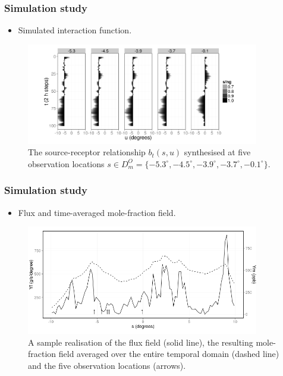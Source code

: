 \documentclass{beamer}
\begin{document}
\begin{frame}
\frametitle{Simulation study}

\begin{itemize}
\item Simulated interaction function.
\end{itemize}

\begin{figure}
\includegraphics[width=4in]{B_plot.png}
\caption{The source-receptor relationship $b_t(s,u)$ synthesised at five observation locations $s \in D^O_m = \{-5.3^\circ, -4.5^\circ,-3.9^\circ,-3.7^\circ,-0.1^\circ\}$.}
\end{figure}
\end{frame}

\begin{frame}
\frametitle{Simulation study}

\begin{itemize}
\item Flux and time-averaged mole-fraction field.
\end{itemize}

\begin{figure}
\includegraphics[width=4in]{Sim_plot2.png}
\caption{A sample realisation of the flux field (solid line), the resulting mole-fraction field averaged over the entire temporal domain (dashed line) and the five observation locations (arrows).}
\end{figure}
\end{frame}
\end{document}
